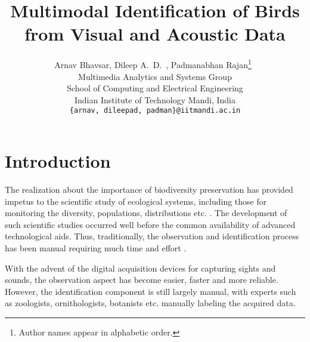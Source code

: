 \documentclass{article}
\begin{document}
\title{Multimodal Identification of Birds from Visual and Acoustic Data}
\author{Arnav Bhavsar, Dileep A.~D.~, Padmanabhan Rajan\footnote{Author names
appear in alphabetic order.}\  \\Multimedia Analytics and Systems Group \\ 
School of Computing and Electrical Engineering\\
Indian Institute of Technology Mandi, India\\
\texttt{\{arnav, dileepad, padman\}@iitmandi.ac.in}}

\date{}
\maketitle

\section{Introduction}






The realization about the importance of biodiversity preservation has provided impetus to the scientific study of ecological systems, including those for monitoring the diversity, populations, distributions etc. \cite{monitor1,monitor2,monitor3,monitor4}. %
The development of such scientific studies occurred well before the common availability of advanced technological aids. Thus, traditionally, the observation and identification process has been manual requiring much time and effort \cite{monitor4,human1,human2}. 

With the advent of the digital acquisition devices for capturing sights and sounds, the observation aspect has become easier, faster and more reliable. However, the identification component is still largely manual, with experts such as zoologists, ornithologists, botanists etc. manually labeling the acquired data. 
\end{document}
